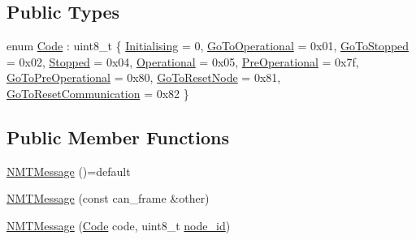 \subsection*{Public Types}
\begin{DoxyCompactItemize}
\item 
enum \hyperlink{class_c_a_nopen_1_1_n_m_t_message_a20257f9fc32b84adc9196fd436f15e95}{Code} \+: uint8\+\_\+t \{ \newline
\hyperlink{class_c_a_nopen_1_1_n_m_t_message_a20257f9fc32b84adc9196fd436f15e95a7fe77fc2c4080c22ffe1833947ccbe9a}{Initialising} = 0, 
\hyperlink{class_c_a_nopen_1_1_n_m_t_message_a20257f9fc32b84adc9196fd436f15e95a545e9a577466163fb58669287c3c6b41}{Go\+To\+Operational} = 0x01, 
\hyperlink{class_c_a_nopen_1_1_n_m_t_message_a20257f9fc32b84adc9196fd436f15e95a7809df81e01fe09e4419db0473038d43}{Go\+To\+Stopped} = 0x02, 
\hyperlink{class_c_a_nopen_1_1_n_m_t_message_a20257f9fc32b84adc9196fd436f15e95a7d6f2ebee6ed9eb78ce062f2c39fcb3f}{Stopped} = 0x04, 
\newline
\hyperlink{class_c_a_nopen_1_1_n_m_t_message_a20257f9fc32b84adc9196fd436f15e95a8060d997fd31646e2abe3ecef93e5224}{Operational} = 0x05, 
\hyperlink{class_c_a_nopen_1_1_n_m_t_message_a20257f9fc32b84adc9196fd436f15e95af0059e344b7e07bdcb934da702a529ad}{Pre\+Operational} = 0x7f, 
\hyperlink{class_c_a_nopen_1_1_n_m_t_message_a20257f9fc32b84adc9196fd436f15e95aac9ea51398ac876f28caa68e5060dc49}{Go\+To\+Pre\+Operational} = 0x80, 
\hyperlink{class_c_a_nopen_1_1_n_m_t_message_a20257f9fc32b84adc9196fd436f15e95a8f2baac414d139872bfef60ecea4ebd8}{Go\+To\+Reset\+Node} = 0x81, 
\newline
\hyperlink{class_c_a_nopen_1_1_n_m_t_message_a20257f9fc32b84adc9196fd436f15e95adc2beca1ff30670ddbe1181b6ba82a0f}{Go\+To\+Reset\+Communication} = 0x82
 \}
\end{DoxyCompactItemize}
\subsection*{Public Member Functions}
\begin{DoxyCompactItemize}
\item 
\hyperlink{class_c_a_nopen_1_1_n_m_t_message_a5e38ad7cb1464480121e527589f4d18f}{N\+M\+T\+Message} ()=default
\item 
\hyperlink{class_c_a_nopen_1_1_n_m_t_message_ae691342a23d0bffa2a98861099c19fcc}{N\+M\+T\+Message} (const can\+\_\+frame \&other)
\item 
\hyperlink{class_c_a_nopen_1_1_n_m_t_message_a5939adf6f14706495b9e734f8412f5d4}{N\+M\+T\+Message} (\hyperlink{class_c_a_nopen_1_1_n_m_t_message_a20257f9fc32b84adc9196fd436f15e95}{Code} code, uint8\+\_\+t \hyperlink{class_c_a_nopen_1_1_message_a845fe0c7682bd6eeef0a5dd87b5e3c63}{node\+\_\+id})
\end{DoxyCompactItemize}


